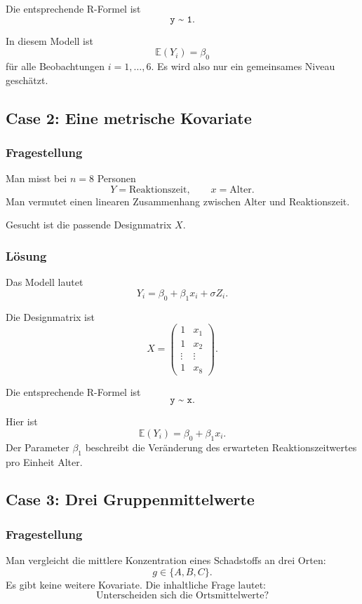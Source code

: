 \documentclass[10pt, letterpaper]{article}
\begin{document}
Die entsprechende R-Formel ist
\[
\texttt{y \textasciitilde{} 1}.
\]

In diesem Modell ist
\[
\mathbb E(Y_i)=\beta_0
\]
für alle Beobachtungen \(i=1,\dots,6\). Es wird also nur ein gemeinsames Niveau geschätzt.

\subsection{Case 2: Eine metrische Kovariate}

\subsubsection*{Fragestellung}

Man misst bei \(n=8\) Personen
\[
Y=\text{Reaktionszeit},
\qquad
x=\text{Alter}.
\]
Man vermutet einen linearen Zusammenhang zwischen Alter und Reaktionszeit.

Gesucht ist die passende Designmatrix \(X\).

\subsubsection*{Lösung}

Das Modell lautet
\[
Y_i=\beta_0+\beta_1x_i+\sigma Z_i.
\]

Die Designmatrix ist
\[
X=
\begin{pmatrix}
1 & x_1\\
1 & x_2\\
\vdots & \vdots\\
1 & x_8
\end{pmatrix}.
\]

Die entsprechende R-Formel ist
\[
\texttt{y \textasciitilde{} x}.
\]

Hier ist
\[
\mathbb E(Y_i)=\beta_0+\beta_1x_i.
\]
Der Parameter \(\beta_1\) beschreibt die Veränderung des erwarteten Reaktionszeitwertes pro Einheit Alter.

\subsection{Case 3: Drei Gruppenmittelwerte}

\subsubsection*{Fragestellung}

Man vergleicht die mittlere Konzentration eines Schadstoffs an drei Orten:
\[
g\in\{A,B,C\}.
\]
Es gibt keine weitere Kovariate. Die inhaltliche Frage lautet:
\[
\text{Unterscheiden sich die Ortsmittelwerte?}
\]
\end{document}
